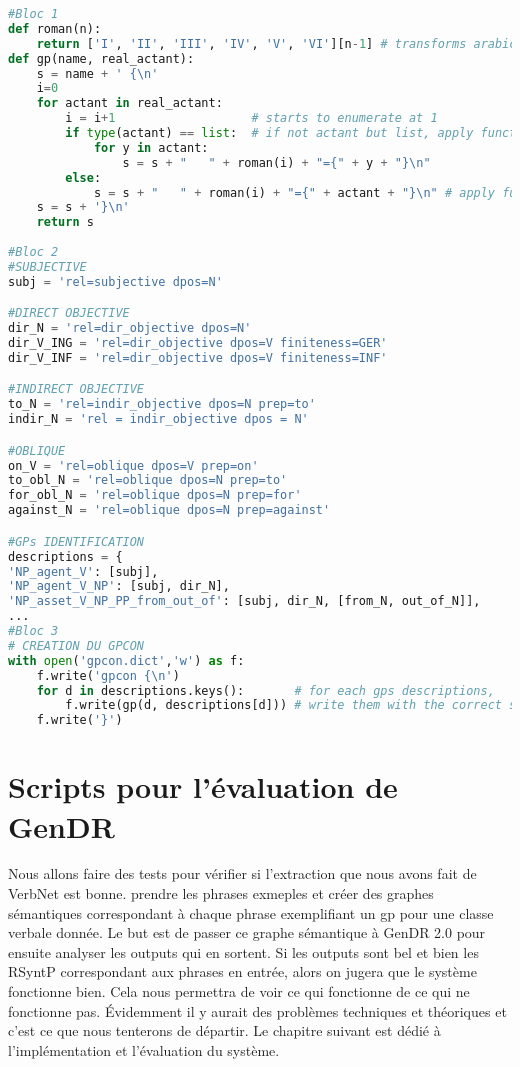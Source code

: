 \begin{lstlisting}[language=Python, caption = code pour gpcon.dict]
#Bloc 1
def roman(n):
    return ['I', 'II', 'III', 'IV', 'V', 'VI'][n-1] # transforms arabic numbers in roman numbers
def gp(name, real_actant):
    s = name + ' {\n'
    i=0
    for actant in real_actant:
        i = i+1                   # starts to enumerate at 1
        if type(actant) == list:  # if not actant but list, apply function to actants in list
            for y in actant:
                s = s + "   " + roman(i) + "={" + y + "}\n"
        else:
            s = s + "   " + roman(i) + "={" + actant + "}\n" # apply function to actant
    s = s + '}\n'
    return s 
		
#Bloc 2
#SUBJECTIVE
subj = 'rel=subjective dpos=N'

#DIRECT OBJECTIVE
dir_N = 'rel=dir_objective dpos=N'
dir_V_ING = 'rel=dir_objective dpos=V finiteness=GER'
dir_V_INF = 'rel=dir_objective dpos=V finiteness=INF'

#INDIRECT OBJECTIVE
to_N = 'rel=indir_objective dpos=N prep=to'
indir_N = 'rel = indir_objective dpos = N'

#OBLIQUE
on_V = 'rel=oblique dpos=V prep=on'
to_obl_N = 'rel=oblique dpos=N prep=to' 
for_obl_N = 'rel=oblique dpos=N prep=for'
against_N = 'rel=oblique dpos=N prep=against'

#GPs IDENTIFICATION
descriptions = {
'NP_agent_V': [subj],
'NP_agent_V_NP': [subj, dir_N],
'NP_asset_V_NP_PP_from_out_of': [subj, dir_N, [from_N, out_of_N]],
...
#Bloc 3
# CREATION DU GPCON
with open('gpcon.dict','w') as f: 
    f.write('gpcon {\n')
    for d in descriptions.keys():       # for each gps descriptions,
        f.write(gp(d, descriptions[d])) # write them with the correct syntactic label
    f.write('}')
\end{lstlisting}

\section{Scripts pour l'évaluation de GenDR}

Nous allons faire des tests pour vérifier si l'extraction que nous avons fait de VerbNet est bonne. prendre les phrases exmeples et créer des graphes sémantiques correspondant à chaque phrase exemplifiant un gp pour une classe verbale donnée. Le but est de passer ce graphe sémantique à GenDR 2.0 pour ensuite analyser les outputs qui en sortent. Si les outputs sont bel et bien les RSyntP correspondant aux phrases en entrée, alors on jugera que le système fonctionne bien. Cela nous permettra de voir ce qui fonctionne de ce qui ne fonctionne pas. Évidemment il y aurait des problèmes techniques et théoriques et c'est ce que nous tenterons de départir. Le chapitre suivant est dédié à l'implémentation et l'évaluation du système.

